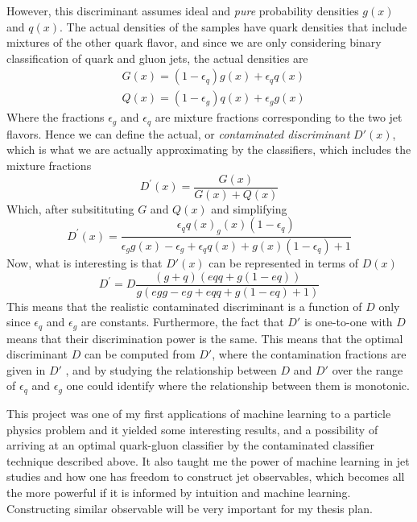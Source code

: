 However, this discriminant assumes ideal and \emph{pure} probability densities $g(x)$ and $q(x)$. The actual densities of the samples have quark densities that include mixtures of the other quark flavor, and since we are only considering binary classification of quark and gluon jets, the actual densities are
\begin{equation}
\begin{aligned}
&G(x)=\left(1-\epsilon_{q}\right) g(x)+\epsilon_{q} q(x) \\
&Q(x)=\left(1-\epsilon_{g}\right) q(x)+\epsilon_{g} g(x)
\end{aligned}
\end{equation}
Where the fractions $\epsilon_g$ and $\epsilon_q$ are mixture fractions corresponding to the two jet flavors. Hence we can define the actual, or \emph{contaminated discriminant} $D'(x)$, which is what we are actually approximating by the classifiers, which includes the mixture fractions
\begin{equation}
    D^{\prime}(x)=\frac{G(x)}{G(x)+Q(x)}
\end{equation}
Which, after subsitituting $G$ and $Q(x)$ and simplifying
\begin{equation}
    D^{\prime}(x)=\frac{\epsilon_{q} q(x)_{g}(x)\left(1-\epsilon_{q}\right)}{\epsilon_{g} g(x)-\epsilon_{g}+\epsilon_{q} q(x)+g(x)\left(1-\epsilon_{q}\right)+1}
\end{equation}
Now, what is interesting is that $D'(x)$ can be represented in terms of $D(x)$
\begin{equation}
    D^{\prime}=D \frac{(g+q)(e q q+g(1-e q))}{g(e g g-e g+e q q+g(1-e q)+1)}
\end{equation}
This means that the realistic contaminated discriminant is a function of $D$ only since $\epsilon_q$ and $\epsilon_g$ are constants. Furthermore, the fact that $D'$ is one-to-one with $D$ means that their discrimination power is the same.  This means that the optimal discriminant $D$ can be computed from
$D'$, where the contamination fractions are given in $D'$
, and by studying the relationship between $D$ and $D'$ over the range of $\epsilon_q$ and $\epsilon_g$ one could identify where
the relationship between them is monotonic.

This project was one of my first applications of machine learning to a particle physics problem and it yielded some interesting results, and a possibility of arriving at an optimal quark-gluon classifier by the contaminated classifier technique described above. It also taught me the power of machine learning in jet studies and how one has freedom to construct jet observables, which becomes all the more powerful if it is informed by intuition and machine learning. Constructing similar observable will be very important for my thesis plan.




